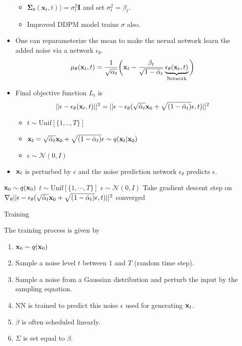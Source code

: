 \begin{itemize}
\begin{itemize}
			\item $\boldsymbol{\Sigma}_\theta(\mathbf{x}_t, t)) = \sigma_t^2\mathbf{I}$ and set $\sigma_t^2 = \beta_t$.
		\item Improved DDPM model trains $\sigma$ also.
		\end{itemize}
	\item One can reparameterize the mean to make the nerual network learn the added noise via a network $\epsilon_\theta$.
		$$\mu_\theta({\mathbf{x}}_t, t) = \frac{1}{\sqrt{\alpha_t}}\bigg({\mathbf{x}}_t - \frac{\beta_t}{\sqrt{1-\bar{\alpha}_t}}\underbrace{\epsilon_\theta({\mathbf{x}}_t,t)}_{\text{Network}}\bigg)$$
	\item Final objective function $L_t$ is
		$$||\epsilon -\epsilon_\theta({\mathbf{x}}_t,t)||^2 = ||\epsilon -\epsilon_\theta(\sqrt{\bar{\alpha}_t}{\mathbf{x}}_0+\sqrt{(1-\bar{\alpha}_t)}\epsilon,t)||^2 $$
		\begin{itemize}
			\item $t\sim\text{Unif}[\{1,..,T\}]$ 
			\item ${\mathbf{x}}_t=\sqrt{\bar{\alpha}_t}{\mathbf{x}}_0+\sqrt{(1-\bar{\alpha}_t)}\epsilon \sim q({\mathbf{x}}_t|{\mathbf{x}}_0)$
			\item $\epsilon\sim \mathcal{N}(0,I)$
		\end{itemize}
	\item ${\mathbf{x}}_t$ is perturbed by $\epsilon$ and the noise prediction network $\epsilon_\theta$ predicts $\epsilon$.
\end{itemize}

\newpage
\begin{algorithm}[t]
	\begin{algorithmic}[1]
		\Repeat
			\State ${\mathbf{x}}_0\sim q({\mathbf{x}}_0)$
			\State $t\sim \text{Unif}[\{1,\cdots,T\}]$
			\State $\epsilon\sim \mathcal{N}(0,I)$
			\State Take gradient descent step on
			$\nabla_\theta||\epsilon -\epsilon_\theta(\sqrt{\bar{\alpha}_t}{\mathbf{x}}_0+\sqrt{(1-\bar{\alpha}_t)}\epsilon,t)||^2 $
		\Until converged
	\end{algorithmic}
	\caption{Training}
	\label{alg:diffusion_training}
\end{algorithm}

The training process is given by
\begin{enumerate}
	\item ${\mathbf{x}}_0\sim q({\mathbf{x}}_0)$ 
	\item Sample a noise level $t$ between $1$ and $T$ (\ie random time step).
	\item Sample a noise from a Gaussian distribution and perturb the input by the sampling equation.
	\item NN is trained to predict this noise $\epsilon$ used for generating ${\mathbf{x}}_t$.
	\item $\beta$ is often scheduled linearly.
	\item $\Sigma$ is set equal to $\beta$.
\end{enumerate}

